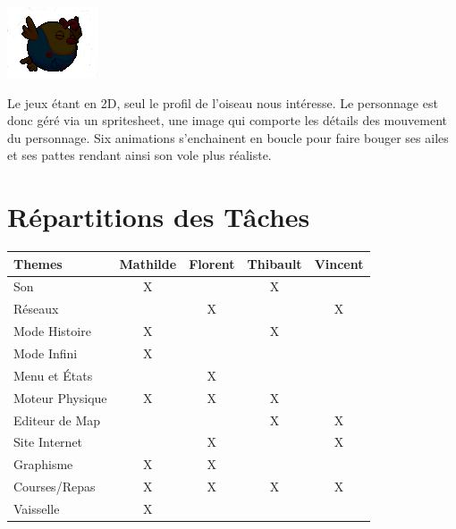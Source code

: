 \documentclass [11pt]{report}
\begin{document}
	\vspace{4mm}
		
		\begin{center}
		\includegraphics[scale=0.5]{images/bird.png}
		\end{center}
		
	\vspace{10mm}
		
	Le jeux étant en 2D, seul le profil de l'oiseau nous intéresse. Le personnage est donc géré via un spritesheet, une image qui comporte les détails des mouvement du personnage. Six animations s'enchainent en boucle pour faire bouger ses ailes et ses pattes rendant ainsi son vole plus réaliste.
	
	
\newpage
	\section{Répartitions des Tâches}
	\vspace{8mm}
	\begin{center}
			\begin{tabular}{| l |*{4} {c|}}
				\hline
				Themes  & Mathilde & Florent & Thibault & Vincent \\
				\hline
				Son     & X &         & X    &        \\
				\hline
				Réseaux       &     & X       &       & X     \\
				\hline
				Mode Histoire     & X &     & X      &       \\
				\hline
				Mode Infini         & X &      &     &          \\
				\hline
				Menu et \'Etats        &  & X    &  &          \\
								\hline
				Moteur Physique & X      & X        & X &           \\
				\hline
				Editeur de Map &     &       & X     &  X\\
				\hline
				Site Internet  &    & X &     &  X       \\
				\hline
				Graphisme      & X  &  X  &         &\\
				\hline
				Courses/Repas      & X  &  X  &  X  & X\\
				\hline
				Vaisselle      & X  &     &         &\\
				\hline
				
			\end{tabular}\\\vspace{3mm}
	\end{center}
	
\end{document}
